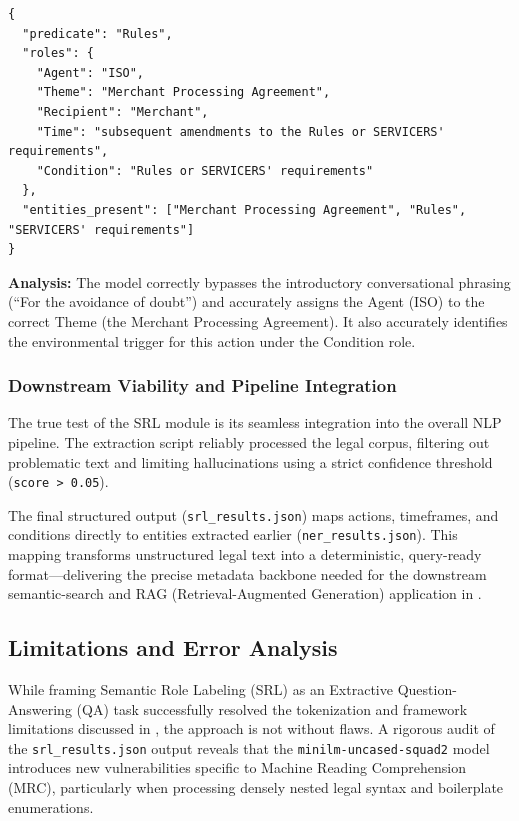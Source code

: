 \documentclass[twoside,final]{hcmut-report}
\newcommand{\result}[1]{\fcolorbox{red}{white}{#1}}
\begin{document}
\begin{verbatim}
{
  "predicate": "Rules",
  "roles": {
    "Agent": "ISO",
    "Theme": "Merchant Processing Agreement",
    "Recipient": "Merchant",
    "Time": "subsequent amendments to the Rules or SERVICERS' requirements",
    "Condition": "Rules or SERVICERS' requirements"
  },
  "entities_present": ["Merchant Processing Agreement", "Rules", "SERVICERS' requirements"]
}
\end{verbatim}

\noindent\textbf{Analysis:} The model correctly bypasses the introductory conversational phrasing (``For the avoidance of doubt'') and accurately assigns the Agent (ISO) to the correct Theme (the Merchant Processing Agreement). It also accurately identifies the environmental trigger for this action under the Condition role.

\subsubsection{Downstream Viability and Pipeline Integration}
The true test of the SRL module is its seamless integration into the overall NLP pipeline. The extraction script reliably processed the legal corpus, filtering out problematic text and limiting hallucinations using a strict confidence threshold (\texttt{score > 0.05}).

\medskip

The final structured output (\texttt{srl\_results.json}) maps actions, timeframes, and conditions directly to entities extracted earlier (\texttt{ner\_results.json}). This mapping transforms unstructured legal text into a deterministic, query-ready format—delivering the precise metadata backbone needed for the downstream semantic-search and RAG (Retrieval-Augmented Generation) application in \result{Assignment~\ref{assignment_3}}.

\subsection{Limitations and Error Analysis}
While framing Semantic Role Labeling (SRL) as an Extractive Question-Answering (QA) task successfully resolved the tokenization and framework limitations discussed in \result{Section~\ref{task_2.2}}, the approach is not without flaws. A rigorous audit of the \texttt{srl\_results.json} output reveals that the \texttt{minilm-uncased-squad2} model introduces new vulnerabilities specific to Machine Reading Comprehension (MRC), particularly when processing densely nested legal syntax and boilerplate enumerations.
\end{document}
